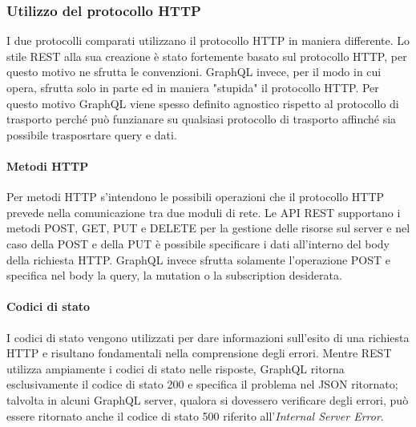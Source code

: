 \subsubsection{Utilizzo del protocollo HTTP}
I due protocolli comparati utilizzano il protocollo HTTP in maniera differente. Lo stile REST alla sua creazione è stato fortemente basato sul protocollo HTTP, per questo motivo ne sfrutta le convenzioni. GraphQL invece, per il modo in cui opera, sfrutta solo in parte ed in maniera "stupida" il protocollo HTTP. Per questo motivo GraphQL viene spesso definito agnostico rispetto al protocollo di trasporto perché può funzianare su qualsiasi protocollo di trasporto affinché sia possibile trasposrtare query e dati.
\paragraph{Metodi HTTP}
Per metodi HTTP s'intendono le possibili operazioni che il protocollo HTTP prevede nella comunicazione tra due moduli di rete. Le API REST supportano i metodi POST, GET, PUT e DELETE per la gestione delle risorse sul server e nel caso della POST e della PUT è possibile specificare i dati all'interno del body della richiesta HTTP. GraphQL invece sfrutta solamente l'operazione POST e specifica nel body la query, la mutation o la subscription desiderata.
\paragraph{Codici di stato}
I codici di stato vengono utilizzati per dare informazioni sull'esito di una richiesta HTTP e risultano fondamentali nella comprensione degli errori. Mentre REST utilizza ampiamente i codici di stato nelle risposte, GraphQL ritorna esclusivamente il codice di stato 200 e specifica il problema nel JSON ritornato; talvolta in alcuni GraphQL server, qualora si dovessero verificare degli errori, può essere ritornato anche il codice di stato 500 riferito all'\textit{Internal Server Error}.
